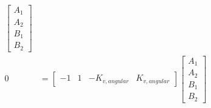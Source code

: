 \begin{align*}
    \begin{bmatrix}
      A_1 \\
      A_2 \\
      B_1 \\
      B_2
    \end{bmatrix} \\
  0 &=
    \begin{bmatrix}
      -1 & 1 & -K_{v,angular} & K_{v,angular}
    \end{bmatrix}
    \begin{bmatrix}
      A_1 \\
      A_2 \\
      B_1 \\
      B_2
    \end{bmatrix}
\end{align*}

